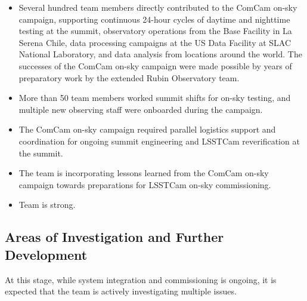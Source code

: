 \begin{itemize}
\begin{itemize}
        \item Several hundred team members directly contributed to the ComCam on-sky campaign, supporting continuous 24-hour cycles of daytime and nighttime testing at the summit, observatory operations from the Base Facility in La Serena Chile, data processing campaigns at the US Data Facility at SLAC National Laboratory, and data analysis from locations around the world.
        The successes of the ComCam on-sky campaign were made possible by years of preparatory work by the extended Rubin Observatory team.
        \item More than 50 team members worked summit shifts for on-sky testing, and multiple new observing staff were onboarded during the campaign.
        \item The ComCam on-sky campaign required parallel logistics support and coordination for ongoing summit engineering and LSSTCam reverification at the summit.
        \item The team is incorporating lessons learned from the ComCam on-sky campaign towards preparations for LSSTCam on-sky commissioning.
        \item Team is strong.
    \end{itemize}
\end{itemize}

\subsection{Areas of Investigation and Further Development}

At this stage, while system integration and commissioning is ongoing, it is expected that the team is actively investigating multiple issues.

